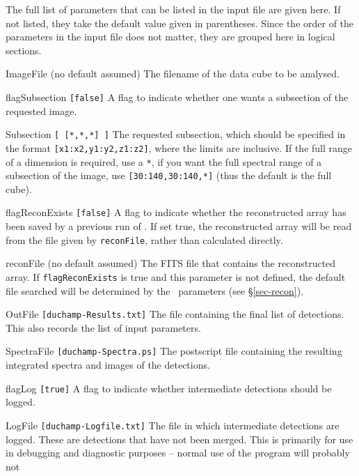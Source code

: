 \label{app-param}

The full list of parameters that can be listed in the input file are
given here. If not listed, they take the default value given in
parentheses. Since the order of the parameters in the input file does
not matter, they are grouped here in logical sections.

\begin{entry}
\item[ImageFile (no default assumed)] The filename of the
  data cube to be analysed.
\item[flagSubsection \texttt{[false]}] A flag to indicate whether one
  wants a subsection of the requested image.
\item[Subsection \texttt{[ [*,*,*] ]}] The requested subsection, which
  should be specified in the format \texttt{[x1:x2,y1:y2,z1:z2]},
  where the limits are inclusive. If the full range of a dimension is
  required, use a \texttt{*}, \eg if you want the full spectral range
  of a subsection of the image, use \texttt{[30:140,30:140,*]} (thus
  the default is the full cube).
\item[flagReconExists \texttt{[false]}] A flag to indicate whether the
  reconstructed array has been saved by a previous run of \duchamp. If
  set true, the reconstructed array will be read from the file given
  by \texttt{reconFile}, rather than calculated directly.
\item[reconFile (no default assumed)] The FITS file that contains the
  reconstructed array. If \texttt{flagReconExists} is true and this
  parameter is not defined, the default file searched will be
  determined by the \atrous\ parameters (see \S\ref{sec-recon}).
\item[OutFile \texttt{[duchamp-Results.txt]}] The file containing the
  final list of detections. This also records the list of input
  parameters.
\item[SpectraFile \texttt{[duchamp-Spectra.ps]}] The postscript file
  containing the resulting integrated spectra and images of the
  detections. 
\item[flagLog \texttt{[true]}] A flag to indicate whether intermediate
  detections should be logged.
\item[LogFile \texttt{[duchamp-Logfile.txt]}] The file in which
  intermediate detections are logged. These are detections that have
  not been merged. This is primarily for use in debugging and
  diagnostic purposes -- normal use of the program will probably not

\end{entry}
